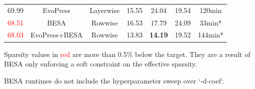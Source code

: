 \begin{table}[h!]
\begin{threeparttable}
\begin{tabular}{ccc|ccc|c}
69.99 & EvoPress & Layerwise & 15.55 & 24.04 & 19.54 & 120min \\
\textcolor{red}{68.51} & BESA & Rowwise & 16.53 & 17.79 & 24.09 & 33min* \\
\textcolor{red}{68.03} & EvoPress+BESA & Rowwise & 13.83 & \textbf{14.19} & 19.52 & 144min* \\
\bottomrule
\end{tabular}
\begin{tablenotes}
\footnotesize
\item[\textcolor{red}{\textbullet}] Sparsity values in \textcolor{red}{red} are more than 0.5\% below the target. They are a result of BESA only enforcing a soft constraint on the effective sparsity.
\item[*] BESA runtimes do not include the hyperparameter sweep over `-d-coef`.
\end{tablenotes}
\end{threeparttable}
\end{table}


